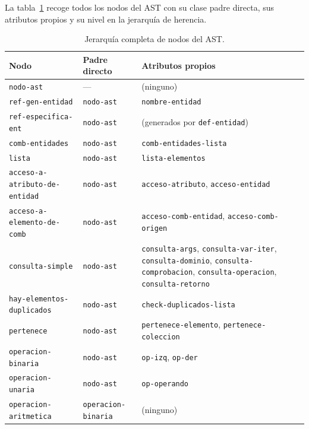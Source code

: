 \documentclass[12pt,a4paper]{report}
\begin{document}
La tabla~\ref{tab:jerarquia-completa} recoge todos los nodos del AST con
su clase padre directa, sus atributos propios y su nivel en la jerarquía
de herencia.


\begin{table}[h!]
\centering
\caption{Jerarquía completa de nodos del AST.}
\label{tab:jerarquia-completa}
\renewcommand{\arraystretch}{1.2}
\begin{tabular}{p{5cm} p{4cm} p{5.3cm}}
\hline
\textbf{Nodo} & \textbf{Padre directo} & \textbf{Atributos propios} \\
\hline
\texttt{nodo-ast}            & ---                          & (ninguno) \\
\texttt{ref-gen-entidad}     & \texttt{nodo-ast}            & \texttt{nombre-entidad} \\
\texttt{ref-especifica-ent}  & \texttt{nodo-ast}            & (generados por \texttt{def-entidad}) \\
\hline
\texttt{comb-entidades}      & \texttt{nodo-ast}            & \texttt{comb-entidades-lista} \\
\texttt{lista}               & \texttt{nodo-ast}            & \texttt{lista-elementos} \\
\hline
\texttt{acceso-a-atributo-de-entidad} & \texttt{nodo-ast}   & \texttt{acceso-atributo}, \texttt{acceso-entidad} \\
\texttt{acceso-a-elemento-de-comb}    & \texttt{nodo-ast}   & \texttt{acceso-comb-entidad}, \texttt{acceso-comb-origen} \\
\hline
\texttt{consulta-simple}     & \texttt{nodo-ast}
  & \texttt{consulta-args}, \texttt{consulta-var-iter},
    \texttt{consulta-dominio}, \texttt{consulta-comprobacion},
    \texttt{consulta-operacion}, \texttt{consulta-retorno} \\
\hline
\texttt{hay-elementos-duplicados} & \texttt{nodo-ast}       & \texttt{check-duplicados-lista} \\
\texttt{pertenece}           & \texttt{nodo-ast}            & \texttt{pertenece-elemento}, \texttt{pertenece-coleccion} \\
\hline
\texttt{operacion-binaria}   & \texttt{nodo-ast}            & \texttt{op-izq}, \texttt{op-der} \\
\texttt{operacion-unaria}    & \texttt{nodo-ast}            & \texttt{op-operando} \\
\hline
\texttt{operacion-aritmetica}     & \texttt{operacion-binaria} & (ninguno) \\

\end{tabular}
\end{table}
\end{document}

